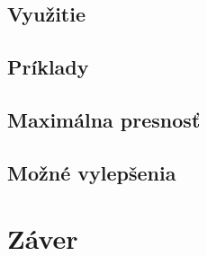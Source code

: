 \section{Využitie}


\section{Príklady}

\section{Maximálna presnosť}

\section{Možné vylepšenia}

\chapter{Záver}
\label{zaver}


